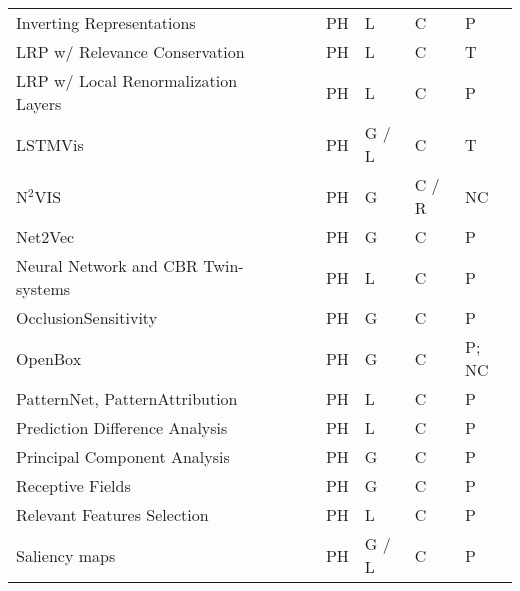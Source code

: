 \documentclass[final,1p,times]{elsarticle}
\begin{document}
\begin{table}[htbp]
\begin{tabular}{m{3.9cm} m{2.7cm} m{0.5cm} m{0.5cm} m{0.5cm} m{0.6cm} m{0.8cm} m{1.05cm}}
    Inverting Representations  &  \citeauthor{mahendran2015understanding} & \cite{mahendran2015understanding} &  \citeyear{mahendran2015understanding} & PH & L & C & P\\
    LRP w/ Relevance Conservation & \citeauthor{arras2017explaining} & \cite{arras2017explaining} &  \citeyear{arras2017explaining} & PH & L & C & T\\
    LRP w/ Local Renormalization Layers &  \citeauthor{binder2016layer} & \cite{binder2016layer} &  \citeyear{binder2016layer} & PH & L & C & P\\
    LSTMVis &  \citeauthor{strobelt2018lstmvis} & \cite{strobelt2018lstmvis} & \citeyear{strobelt2018lstmvis} & PH & G / L & C & T\\
    N$^2$VIS & \citeauthor{streeter2001nvis} & \cite{streeter2001nvis} & \citeyear{streeter2001nvis} & PH & G & C / R & NC\\
    Net2Vec &  \citeauthor{fong2018net2vec} & \cite{fong2018net2vec} & \citeyear{fong2018net2vec} & PH & G & C & P\\
    Neural Network and CBR Twin-systems & \citeauthor{kenny2019twin} & \cite{kenny2019twin} &  \citeyear{kenny2019twin} & PH & L & C & P\\
    OcclusionSensitivity &  \citeauthor{zeiler2014visualizing} &  \cite{zeiler2014visualizing} &  \citeyear{zeiler2014visualizing} & PH & G & C & P\\
    OpenBox &  \citeauthor{chu2018exact} &  \cite{chu2018exact} &  \citeyear{chu2018exact} & PH & G & C & P; NC\\
    PatternNet, PatternAttribution &  \citeauthor{kindermans2018learning} &  \cite{kindermans2018learning} &  \citeyear{kindermans2018learning} & PH & L & C & P\\
    Prediction Difference Analysis &  \citeauthor{zintgraf2017visualizing} &  \cite{zintgraf2017visualizing} &  \citeyear{zintgraf2017visualizing} & PH & L & C & P\\
    Principal Component Analysis & \citeauthor{aubry2015understanding} &  \cite{aubry2015understanding} &  \citeyear{aubry2015understanding} & PH & G & C & P\\
    Receptive Fields &  \citeauthor{he2017deep} & \cite{he2017deep} &  \citeyear{he2017deep} & PH & G & C & P\\
    Relevant Features Selection &  \citeauthor{mogrovejo2019visual} &  \cite{mogrovejo2019visual} &  \citeyear{mogrovejo2019visual} & PH & L & C & P\\
    Saliency maps &  \citeauthor{olah2018building} & \cite{olah2018building} &  \citeyear{olah2018building} & PH & G / L & C & P\\

\end{tabular}
\end{table}
\end{document}
